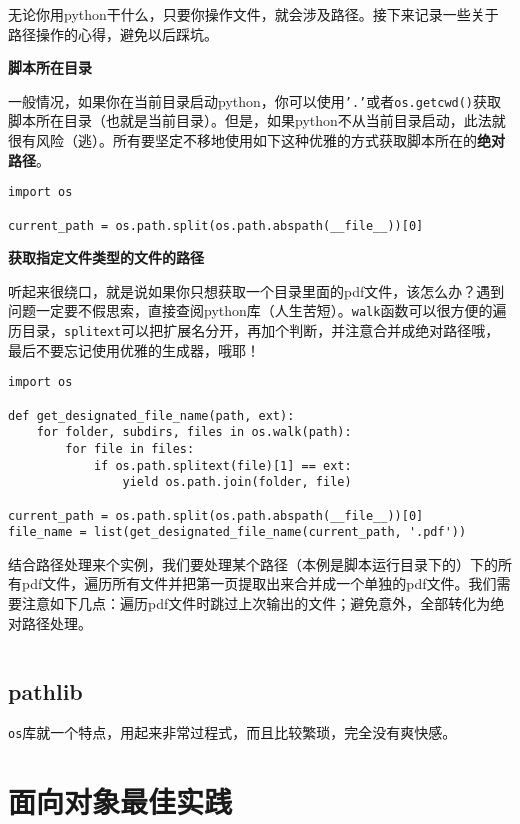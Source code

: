 无论你用python干什么，只要你操作文件，就会涉及路径。接下来记录一些关于路径操作的心得，避免以后踩坑。

\textbf{脚本所在目录}

一般情况，如果你在当前目录启动python，你可以使用\texttt{'.'}或者\texttt{os.getcwd()}获取脚本所在目录（也就是当前目录）。但是，如果python不从当前目录启动，此法就很有风险（逃）。所有要坚定不移地使用如下这种优雅的方式获取脚本所在的\textbf{绝对路径}。

\begin{verbatim}
import os

current_path = os.path.split(os.path.abspath(__file__))[0]
\end{verbatim}

\textbf{获取指定文件类型的文件的路径}

听起来很绕口，就是说如果你只想获取一个目录里面的pdf文件，该怎么办？遇到问题一定要不假思索，直接查阅python库（人生苦短）。\texttt{walk}函数可以很方便的遍历目录，\texttt{splitext}可以把扩展名分开，再加个判断，并注意合并成绝对路径哦，最后不要忘记使用优雅的生成器，哦耶！

\begin{verbatim}
import os

def get_designated_file_name(path, ext):
    for folder, subdirs, files in os.walk(path):
        for file in files:
            if os.path.splitext(file)[1] == ext:
                yield os.path.join(folder, file)

current_path = os.path.split(os.path.abspath(__file__))[0]
file_name = list(get_designated_file_name(current_path, '.pdf'))
\end{verbatim}

结合路径处理来个实例，我们要处理某个路径（本例是脚本运行目录下的）下的所有pdf文件，遍历所有文件并把第一页提取出来合并成一个单独的pdf文件。我们需要注意如下几点：遍历pdf文件时跳过上次输出的文件；避免意外，全部转化为绝对路径处理。

\inputminted{python}{code/python/treat_pdf.py}

\subsection{pathlib}

\texttt{os}库就一个特点，用起来非常过程式，而且比较繁琐，完全没有爽快感。

\section{面向对象最佳实践}



